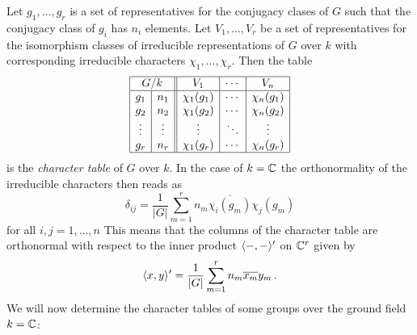 \begin{fluff}
  Let $g_1, \dotsc, g_r$ is a set of representatives for the conjugacy clases of $G$ such that the conjugacy class of $g_i$ has $n_i$ elements.
  Let $V_1, \dotsc, V_r$ be a set of representatives for the isomorphism classes of irreducible representations of $G$ over $k$ with corresponding irreducible characters $\chi_1, \dotsc, \chi_r$.
  Then the table
  \[
    \begin{array}{|c|c||c|c|c|}
      \hline
        \multicolumn{2}{|c||}{G/k}
      & V_1
      & \cdots
      & V_n
      \\
      \hline
        g_1
      & n_1
      & \chi_1(g_1)
      & \cdots
      & \chi_n(g_1)
      \\
        g_2
      & n_2
      & \chi_1(g_2)
      & \cdots
      & \chi_n(g_2)
      \\
        \vdots
      & \vdots
      & \vdots
      & \ddots
      & \vdots
      \\
        g_r
      & n_r
      & \chi_1(g_r)
      & \cdots
      & \chi_n(g_r)
      \\
      \hline
    \end{array}
  \]
  is the \emph{character table} of $G$ over $k$.
  In the case of $k = \mathbb{C}$ the orthonormality of the irreducible characters then reads as
  \[
      \delta_{ij}
    = \frac{1}{|G|} \sum_{m=1}^r n_m \overline{\chi_i(g_m)} \chi_j(g_m)
  \]
  for all $i, j = 1, \dotsc, n$
  This means that the columns of the character table are orthonormal with respect to the inner product $\langle -,- \rangle'$ on $\mathbb{C}^r$ given by
  \[
      \langle x,y \rangle'
    = \frac{1}{|G|} \sum_{m=1}^r n_m \overline{x_m} y_m \,.
  \]
  We will now determine the character tables of some groups over the ground field $k = \mathbb{C}$:
\end{fluff}


